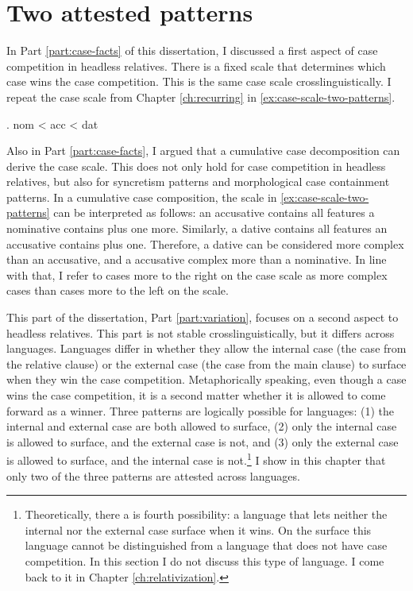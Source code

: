 
\chapter{Two attested patterns}

In Part \ref{part:case-facts} of this dissertation, I discussed a first aspect of case competition in headless relatives. There is a fixed scale that determines which case wins the case competition. This is the same case scale crosslinguistically. I repeat the case scale from Chapter \ref{ch:recurring} in \ref{ex:case-scale-two-patterns}.

\ex. \ac{nom} < \ac{acc} < \ac{dat}\label{ex:case-scale-two-patterns}

Also in Part \ref{part:case-facts}, I argued that a cumulative case decomposition can derive the case scale. This does not only hold for case competition in headless relatives, but also for syncretism patterns and morphological case containment patterns. In a cumulative case composition, the scale in \ref{ex:case-scale-two-patterns} can be interpreted as follows: an accusative contains all features a nominative contains plus one more. Similarly, a dative contains all features an accusative contains plus one. Therefore, a dative can be considered more complex than an accusative, and a accusative complex more than a nominative. In line with that, I refer to cases more to the right on the case scale as more complex cases than cases more to the left on the scale.

This part of the dissertation, Part \ref{part:variation}, focuses on a second aspect to headless relatives. This part is not stable crosslinguistically, but it differs across languages. Languages differ in whether they allow the internal case (the case from the relative clause) or the external case (the case from the main clause) to surface when they win the case competition. Metaphorically speaking, even though a case wins the case competition, it is a second matter whether it is allowed to come forward as a winner. Three patterns are logically possible for languages: (1) the internal and external case are both allowed to surface, (2) only the internal case is allowed to surface, and the external case is not, and (3) only the external case is allowed to surface, and the internal case is not.\footnote{
Theoretically, there a is fourth possibility: a language that lets neither the internal nor the external case surface when it wins. On the surface this language cannot be distinguished from a language that does not have case competition. In this section I do not discuss this type of language. I come back to it in Chapter \ref{ch:relativization}.
}
I show in this chapter that only two of the three patterns are attested across languages.

